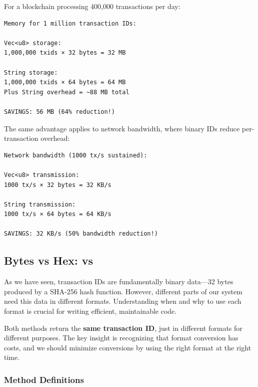 For a blockchain processing 400,000 transactions per day:

\begin{verbatim}
Memory for 1 million transaction IDs:

Vec<u8> storage:
1,000,000 txids × 32 bytes = 32 MB

String storage:
1,000,000 txids × 64 bytes = 64 MB
Plus String overhead = ~88 MB total

SAVINGS: 56 MB (64% reduction!)
\end{verbatim}

The same advantage applies to network bandwidth, where binary IDs reduce per-transaction overhead:

\begin{verbatim}
Network bandwidth (1000 tx/s sustained):

Vec<u8> transmission:
1000 tx/s × 32 bytes = 32 KB/s

String transmission:
1000 tx/s × 64 bytes = 64 KB/s

SAVINGS: 32 KB/s (50% bandwidth reduction!)
\end{verbatim}

\subsection{Bytes vs Hex:  vs }
\label{sec:ch06-bytes-vs-hex}

As we have seen, transaction IDs are fundamentally binary data---32 bytes produced by a SHA-256 hash function. However, different parts of our system need this data in different formats. Understanding when and why to use each format is crucial for writing efficient, maintainable code.

Both methods return the \textbf{same transaction ID}, just in different formats for different purposes. The key insight is recognizing that format conversion has costs, and we should minimize conversions by using the right format at the right time.

\needspace{2in}
\subsubsection{Method Definitions}
\label{sec:ch06-method-defs}

